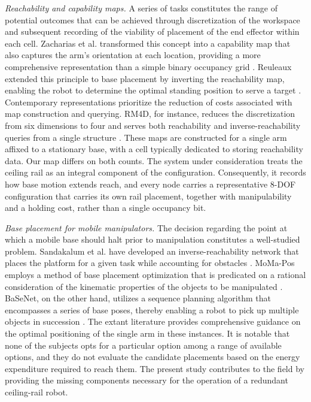 \documentclass[conference]{IEEEtran}
\begin{document}
\noindent\textit{Reachability and capability maps.}
A series of tasks constitutes the range of potential outcomes that can be 
achieved through discretization of the workspace and subsequent recording of 
the viability of placement of the end effector within each cell. Zacharias et al. 
transformed this concept into a capability map that also captures the arm's orientation 
at each location, providing a more comprehensive representation than a simple binary 
occupancy grid \cite{Zacharias2007}. Reuleaux extended this principle to base placement 
by inverting the reachability map, enabling the robot to determine the optimal 
standing position to serve a target \cite{Makhal2018}. Contemporary representations 
prioritize the reduction of costs associated with map construction and querying. 
RM4D, for instance, reduces the discretization from six dimensions to four and 
serves both reachability and inverse-reachability queries from a single structure \cite{RM4D2024}. 
These maps are constructed for a single arm affixed to a stationary base, 
with a cell typically dedicated to storing reachability data. Our map differs 
on both counts. The system under consideration treats the ceiling rail as an integral 
component of the configuration. Consequently, it records how base motion extends reach, 
and every node carries a representative 8-DOF configuration that carries its own rail 
placement, together with manipulability and a holding cost, rather than a single occupancy bit.

\noindent\textit{Base placement for mobile manipulators.}
The decision regarding the point at which a mobile base should halt prior to 
manipulation constitutes a well-studied problem. Sandakalum et al. have developed an 
inverse-reachability network that places the platform for a given task while accounting 
for obstacles \cite{InvReach2022}.
MoMa-Pos employs a method of base placement optimization that is predicated on a 
rational consideration of the kinematic properties of the objects to be manipulated \cite{MoMaPos2024}. 
BaSeNet, on the other hand, utilizes a sequence planning algorithm that encompasses 
a series of base poses, thereby enabling a robot to pick up multiple objects in 
succession \cite{BaSeNet2024}. The extant literature provides comprehensive guidance 
on the optimal positioning of the single arm in these instances. It is notable that 
none of the subjects opts for a particular option among a range of available options, 
and they do not evaluate the candidate placements based on the energy expenditure 
required to reach them. The present study contributes to the field by providing 
the missing components necessary for the operation of a redundant ceiling-rail robot. 
\end{document}
